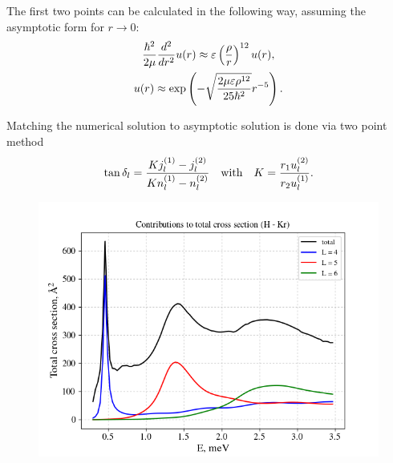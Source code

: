 \documentclass[10pt,pdf,hyperref={unicode}]{beamer}
\newcommand{\lb}{\left(}
\newcommand{\rb}{\right)}
\begin{document}
\begin{frame}{}
	The first two points can be calculated in the following way, assuming the asymptotic form for $r \rightarrow 0$:
	\begin{gather}
		\frac{\hbar^2}{2\mu} \frac{d^2}{dr^2} u(r) \approx \varepsilon \lb \frac{\rho}{r} \rb^{12} u(r), \notag \\
		u(r) \approx \exp \lb - \sqrt{\frac{2 \mu \varepsilon \rho^{12}}{25 \hbar^2}} r^{-5} \rb . \notag 
	\end{gather}

	Matching the numerical solution to asymptotic solution is done via two point method
	\begin{gather}
		\tan \delta_l = \frac{K j_l^{(1)} - j_l^{(2)}}{K n_l^{(1)} - n_l^{(2)}} \quad \text{with} \quad K = \frac{r_1 u_l^{(2)}}{r_2 u_l^{(1)}}. \notag
	\end{gather}
\end{frame}

\begin{frame}
	\begin{figure}
		\includegraphics[scale=0.5]{../numerov_LJ/pictures/contributions.png}
	\end{figure}
\end{frame}
\end{document}
